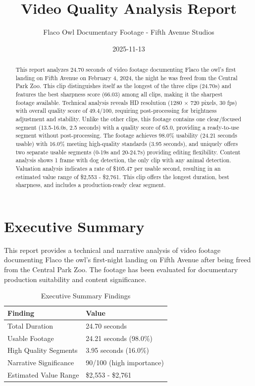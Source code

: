 \documentclass[
  11pt,
]{article}
\title{Video Quality Analysis Report}
\subtitle{Flaco Owl Documentary Footage - Fifth Avenue Studios}
\author{}
\date{2025-11-13}
\begin{document}
\maketitle
\begin{abstract}
This report analyzes 24.70 seconds of video footage documenting Flaco
the owl's first landing on Fifth Avenue on February 4, 2024, the night
he was freed from the Central Park Zoo. This clip distinguishes itself
as the longest of the three clips (24.70s) and features the best
sharpness score (66.03) among all clips, making it the sharpest footage
available. Technical analysis reveals HD resolution (1280 × 720 pixels,
30 fps) with overall quality score of 49.4/100, requiring
post-processing for brightness adjustment and stability. Unlike the
other clips, this footage contains one clear/focused segment
(13.5-16.0s, 2.5 seconds) with a quality score of 65.0, providing a
ready-to-use segment without post-processing. The footage achieves
98.0\% usability (24.21 seconds usable) with 16.0\% meeting high-quality
standards (3.95 seconds), and uniquely offers two separate usable
segments (0-19s and 20-24.7s) providing editing flexibility. Content
analysis shows 1 frame with dog detection, the only clip with any animal
detection. Valuation analysis indicates a rate of \$105.47 per usable
second, resulting in an estimated value range of \$2,553 - \$2,761. This
clip offers the longest duration, best sharpness, and includes a
production-ready clear segment.
\end{abstract}
\ifdefined\Shaded\renewenvironment{Shaded}{\begin{tcolorbox}[borderline west={3pt}{0pt}{shadecolor}, frame hidden, interior hidden, sharp corners, breakable, boxrule=0pt, enhanced]}{\end{tcolorbox}}\fi

\needspace{8cm}
\section{Executive Summary}

This report provides a technical and narrative analysis of video footage
documenting Flaco the owl's first-night landing on Fifth Avenue after
being freed from the Central Park Zoo. The footage has been evaluated
for documentary production suitability and content significance.

\begin{table}[h]
\centering
\small
\caption{Executive Summary Findings}
\label{tab-exec-summary}
\begin{tabular}{p{3cm}p{8cm}}
\toprule
\textbf{Finding} & \textbf{Value} \\
\midrule
Total Duration & 24.70 seconds \\
Usable Footage & 24.21 seconds (98.0\%) \\
High Quality Segments & 3.95 seconds (16.0\%) \\
Narrative Significance & 90/100 (high importance) \\
Estimated Value Range & \$2,553 - \$2,761 \\
\bottomrule
\end{tabular}
\end{table}
\end{document}
